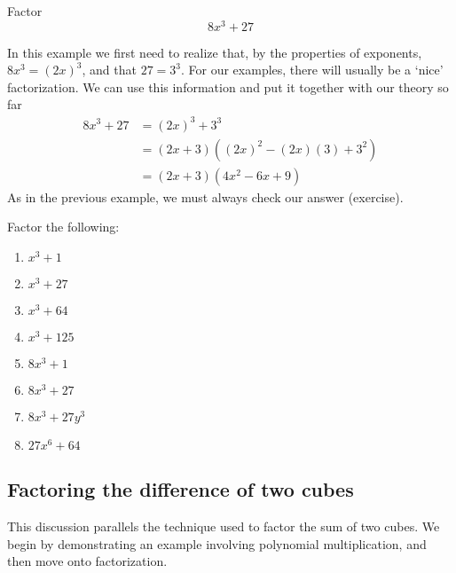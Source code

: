 \begin{myexample}\label{ex:anothersumcubes}
Factor
\[
	8x^3+27
\]
\end{myexample}
\begin{myProof}
	In this example we first need to realize that, by the properties of exponents, $8x^3 = (2x)^3$, and
	that $27=3^3$. For our examples, there will usually be a `nice' factorization. We can use this
	information and put it together with our theory so far
	\begin{align*}
		8x^3+27 & =  (2x)^3+3^3                 \\
		        & =  (2x+3)((2x)^2-(2x)(3)+3^2) \\
		        & =  (2x+3)(4x^2-6x +9)         
	\end{align*}{} 
	As in the previous example, we must always check our answer (exercise).
\end{myProof} 

\begin{myexample}
\drillandskill
Factor the following:
\end{myexample}

\begin{multicols}{2}
	\begin{enumerate}
		\item $x^3+1$    
		\item $x^3+27$   
		\item $x^3+64$   
		\item $x^3+125$  
		\item $8x^3+1$   
		\item $8x^3+27$  
		\item $8x^3+27y^3$
		\item $27x^6+64$  
	\end{enumerate}
\end{multicols}

\subsection{Factoring the difference of two cubes}
This discussion parallels the technique used to factor the sum of two cubes. We begin by
demonstrating an example involving polynomial multiplication, and then move onto factorization.

